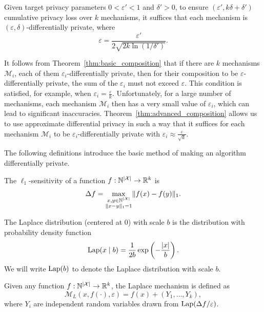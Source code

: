 \begin{theorem}
\label{thm:advanced_composition}
Given target privacy parameters $0 < \varepsilon' < 1$ and $\delta' > 0$, to ensure $(\varepsilon', k\delta + \delta')$ cumulative privacy loss over $k$ mechanisms, it suffices that each mechanism is $(\varepsilon, \delta)$-differentially private, where
\[
\varepsilon = \frac{\varepsilon'}{2 \sqrt{2 k \ln(1/\delta')}}.
\]
\end{theorem}

It follows from Theorem~\ref{thm:basic_composition} that if there are $k$ mechanisms $\mathcal{M}_i$, each of them $\varepsilon_i$-differentially private, then for their composition to be $\varepsilon$-differentially private, the sum of the $\varepsilon_i$ must not exceed $\varepsilon$. This condition is satisfied, for example, when $\varepsilon_i = \frac{\varepsilon}{k}$. Unfortunately, for a large number of mechanisms, each mechanism $\mathcal{M}_i$ then has a very small value of $\varepsilon_i$, which can lead to significant inaccuracies. Theorem~\ref{thm:advanced_composition} allows us to use approximate differential privacy in such a way that it suffices for each mechanism $\mathcal{M}_i$ to be $\varepsilon_i$-differentially private with $\varepsilon_i \approx \frac{\varepsilon}{\sqrt{k}}$.

The following definitions introduce the basic method of making an algorithm differentially private.

\begin{definition}
\label{def:sensitivity_def}
The $\ell_1$-sensitivity of a function $f : \mathbb{N}^{\lvert\mathcal{X}\rvert} \rightarrow \mathbb{R}^k$ is
\[
\Delta f = \max_{\substack{x, y \in \mathbb{N}^{\lvert\mathcal{X}\rvert} \\ \lVert x - y\rVert_1 = 1}} \lVert f(x) - f(y)\rVert_1.
\]
\end{definition}

\begin{definition}
The Laplace distribution (centered at $0$) with scale $b$ is the distribution with probability density function
\[
\operatorname{Lap}(x \mid b) = \frac{1}{2b} \exp\left( -\frac{\lvert x\rvert}{b} \right).
\]
We will write $\operatorname{Lap}(b)$ to denote the Laplace distribution with scale $b$.
\end{definition}

\begin{definition}
Given any function $f : \mathbb{N}^{\lvert\mathcal{X}\rvert} \rightarrow \mathbb{R}^k$, the Laplace mechanism is defined as
\[
\mathcal{M}_L(x, f(\cdot), \varepsilon) = f(x) + (Y_1, \ldots, Y_k),
\]
where $Y_i$ are independent random variables drawn from $\operatorname{Lap}(\Delta f / \varepsilon)$.
\end{definition}


